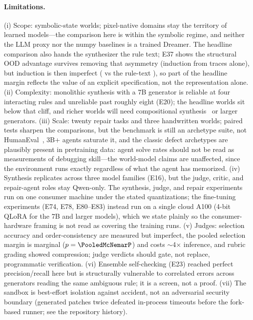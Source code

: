 \documentclass[11pt]{article}
\begin{document}
\paragraph{Limitations.} (i) Scope: symbolic-state worlds; pixel-native
domains stay the territory of learned models---the comparison here is
within the symbolic regime, and neither the LLM proxy nor the numpy
baselines is a trained Dreamer. The headline comparison also hands the
synthesizer the rule text; E37 shows the structural OOD advantage survives
removing that asymmetry (induction from traces alone), but induction is then
imperfect (\IndTracesIn{} vs the rule-text \IndRulesIn), so part of the
headline margin reflects the value of an explicit specification, not the
representation alone. (ii) Complexity: monolithic synthesis with a
7B generator is reliable at four interacting rules and unreliable past
roughly eight (E20); the headline worlds sit below that cliff, and richer
worlds will need compositional synthesis~\cite{poeworld2025} or larger
generators. (iii) Scale: twenty repair tasks and three handwritten worlds;
paired tests sharpen the comparisons, but the benchmark is still an archetype
suite, not HumanEval~\cite{humaneval2021}, 3B+ agents saturate it, and the
classic defect archetypes are plausibly present in pretraining data: agent
solve rates should not be read as measurements of debugging skill---the
world-model claims are unaffected, since the environment runs exactly
regardless of what the agent has memorized. (iv) Synthesis replicates across
three model families (E16), but the judge, critic, and repair-agent roles
stay Qwen-only. The synthesis, judge, and repair experiments run on one
consumer machine under the stated quantizations; the fine-tuning experiments
(E74, E78, E80--E83) instead run on a single cloud A100 (4-bit QLoRA for the 7B
and larger models), which we state plainly so the consumer-hardware framing is
not read as covering the training runs. (v) Judges: selection accuracy and order-consistency are
measured but imperfect, the pooled selection margin is marginal
($p=\PooledMcNemarP$) and costs $\sim$4$\times$ inference, and rubric grading
showed compression; judge verdicts should gate, not replace, programmatic
verification. (vi) Ensemble self-checking (E23) reached perfect
precision/recall here but is structurally vulnerable to correlated errors
across generators reading the same ambiguous rule; it is a screen, not a
proof. (vii) The sandbox is best-effort isolation against accident, not an
adversarial security boundary (generated patches twice defeated in-process
timeouts before the fork-based runner; see the repository history).
\end{document}
